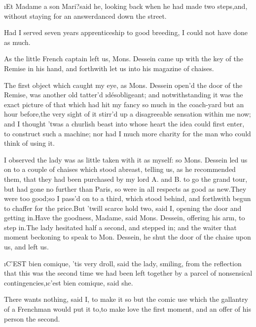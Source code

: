\documentclass[twoside]{article}
\begin{document}
\tsk \i{Et Madame a son Mari}?\tsk said he, looking back when he had made two
steps,\tsk and, without staying for an answer\tsk danced down the street.

Had I served seven years apprenticeship to good breeding, I could not
have done as much.






As the little French captain left us, Mons. Dessein came up with the key
of the Remise in his hand, and forthwith let us into his magazine of
chaises.

The first object which caught my eye, as Mons. Dessein open’d the door of
the Remise, was another old tatter’d \i{désobligeant}; and notwithstanding
it was the exact picture of that which had hit my fancy so much in the
coach-yard but an hour before,\tsk the very sight of it stirr’d up a
disagreeable sensation within me now; and I thought ’twas a churlish
beast into whose heart the idea could first enter, to construct such a
machine; nor had I much more charity for the man who could think of using
it.

I observed the lady was as little taken with it as myself: so Mons.
Dessein led us on to a couple of chaises which stood abreast, telling us,
as he recommended them, that they had been purchased by my lord A. and B.
to go the grand tour, but had gone no further than Paris, so were in all
respects as good as new.\tsk They were too good;\tsk so I pass’d on to a third,
which stood behind, and forthwith begun to chaffer for the price.\tsk But
’twill scarce hold two, said I, opening the door and getting in.\tsk Have the
goodness, Madame, said Mons. Dessein, offering his arm, to step in.\tsk The
lady hesitated half a second, and stepped in; and the waiter that moment
beckoning to speak to Mon. Dessein, he shut the door of the chaise upon
us, and left us.






\i{C’EST bien comique}, ’tis very droll, said the lady, smiling, from the
reflection that this was the second time we had been left together by a
parcel of nonsensical contingencies,\tsk \i{c’est bien comique}, said she.\tsk 

\tsk There wants nothing, said I, to make it so but the comic use which the
gallantry of a Frenchman would put it to,\tsk to make love the first moment,
and an offer of his person the second.
\end{document}
